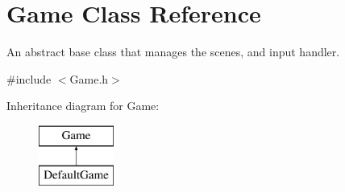 \hypertarget{class_game}{}\section{Game Class Reference}
\label{class_game}


An abstract base class that manages the scenes, and input handler.  




{\ttfamily \#include $<$Game.\+h$>$}

Inheritance diagram for Game\+:\begin{figure}[H]
\begin{center}
\leavevmode
\includegraphics[height=2.000000cm]{class_game}
\end{center}
\end{figure}
